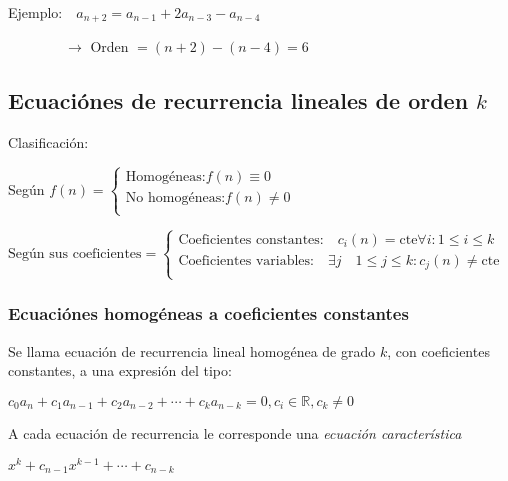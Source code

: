 \documentclass[a4paper, twoside]{article}
\begin{document}
	Ejemplo:$\quad a_{n+2} = a_{n-1} + 2 a_{n-3} - a_{n-4}$
	
	\vspace{0.25cm}
	$\quad \quad \quad \quad \rightarrow$ Orden $= (n+2) - (n-4) = 6$  
	
	\subsection{Ecuaciónes de recurrencia lineales de orden $k$}
	
	Clasificación:
	
	\vspace{0.25cm}
	Según $f(n) = \left\{ \begin{array}{c}
		\text{Homogéneas:} f(n) \equiv 0\\
		\text{No homogéneas:} f(n) \neq 0\\
		\end{array}\right.$
	
	\vspace{0.25cm}
		$\text{Según sus coeficientes} = \left\{ \begin{array}{c}
		\text{Coeficientes constantes:} \quad c_{i}(n) = \text{cte} \forall i:1 \le i \le k\\
		\text{Coeficientes variables:} \quad \exists j \quad 1 \le j \le k : c_{j}(n) \neq \text{cte} \\
		\end{array}\right.$
		
	\subsubsection{Ecuaciónes homogéneas a coeficientes constantes}
	Se llama ecuación de recurrencia lineal homogénea de grado $k$, con coeficientes constantes, a una expresión del tipo:
	
	\begin{center}
	$c_0 a_n + c_1 a_{n-1} + c_2 a_{n-2} + \cdots + c_k a_{n-k} = 0 ,c_i \in \mathbb{R} , c_k \ne 0$
	\end{center}
	\vspace{0.25cm}
	A cada ecuación de recurrencia le corresponde una \emph{ecuación característica}
	
	\begin{center}
		$x^k + c_{n-1} x^{k-1} + \cdots + c_{n-k}$
	\end{center}	
	
\end{document}
